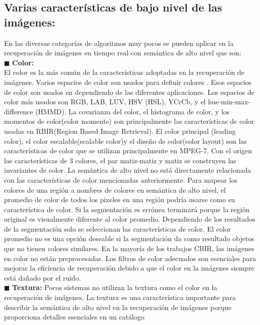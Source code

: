 \documentclass{llncs}
\begin{document}
\subsection{ Varias caracter\'isticas de bajo nivel de las im\'agenes:}

En las diversas categor\'ias de algoritmos muy pocos se pueden aplicar en la recuperaci\'on de im\'agenes en tiempo real con 
sem\'antica de alto nivel que son:\\
$\blacksquare$  \textbf{Color:}\\
El color es la m\'as com\'un de la caracter\'isticas adoptadas en la recuperaci\'on de im\'agenes. Varios espacios de color son usados 
para definir colores . Esos espacios de color son usados en dependiendo de las diferentes aplicaciones. Los espacios de color 
m\'as usados son  RGB, LAB, LUV, HSV (HSL), YCrCb, y el hue-min-max-difference (HMMD). La covarianza del color, el histograma 
de color, y los momentos de color(color moments) son principalmente las caracter\'isticas de color usadas en RBIR(Region Based Image Retrieval).
 El color principal (leading color), el color escalable(scalable color)y el dise\~{n}o de color(color layout) son las caracter\'isticas 
de color que se utilizan principalmente en MPEG-7. Con el origen las caracter\'isticas de 3 colores, el par matiz-matiz y matiz
se construyen las invariantes de color. La sem\'antica de alto nivel no est\'a directamente relacionada con las caracter\'isticas 
de color mencionadas anteriormente. Para mapear los colores de una regi\'on a nombres de colores en sem\'antica de alto nivel,
el promedio de color de todos los pixeles  en una regi\'on podr\'ia usarse como su caracter\'istica de color. Si la segmentaci\'on
es err\'onea terminar\'a porque la regi\'on original es visualmente diferente al color promedio. Dependiendo de los resultados 
de la segmentaci\'on solo se seleccionan las caracter\'isticas de color. El color promedio no es una opci\'on deseable si la
segmentaci\'on da como resultado objetos que no tienen colores similares. En la mayor\'ia de los trabajos CBIR, las im\'agenes en color no
est\'an preprocesadas. Los filtros de color adecuados son esenciales para mejorar la eficiencia de recuperaci\'on debido a que el color 
en la im\'agenes siempre est\'a da\~{n}ado por el ruido.\\
$\blacksquare$  \textbf{Textura:}
Pocos sistemas no utilizan la textura como el color en la recuperaci\'on de im\'agenes. La textura es una caracter\'istica importante 
para describir la sem\'antica de alto nivel en la recuperaci\'on de im\'agenes porque proporciona detalles esenciales en un cat\'alogo 
\end{document}
